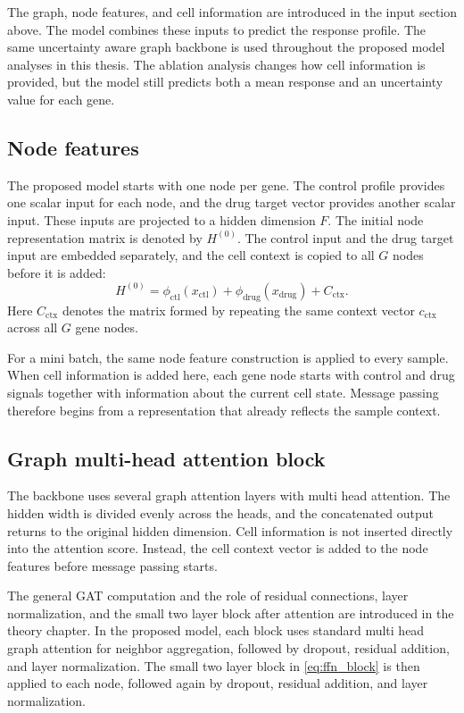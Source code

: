 \noindent The graph, node features, and cell information are introduced in the input section above. The model combines these inputs to predict the response profile. The same uncertainty aware graph backbone is used throughout the proposed model analyses in this thesis. The ablation analysis changes how cell information is provided, but the model still predicts both a mean response and an uncertainty value for each gene.

\subsection{Node features}
The proposed model starts with one node per gene. The control profile provides one scalar input for each node, and the drug target vector provides another scalar input. These inputs are projected to a hidden dimension $F$. The initial node representation matrix is denoted by $H^{(0)}$.
\noindent The control input and the drug target input are embedded separately, and the cell context is copied to all $G$ nodes before it is added:
\begin{equation}
H^{(0)} = \phi_{\mathrm{ctl}}(x_{\mathrm{ctl}}) + \phi_{\mathrm{drug}}(x_{\mathrm{drug}}) + C_{\mathrm{ctx}}.
\end{equation}
\noindent Here $C_{\mathrm{ctx}}$ denotes the matrix formed by repeating the same context vector $c_{\mathrm{ctx}}$ across all $G$ gene nodes.

\noindent For a mini batch, the same node feature construction is applied to every sample.
\noindent When cell information is added here, each gene node starts with control and drug signals together with information about the current cell state. Message passing therefore begins from a representation that already reflects the sample context.

\subsection{Graph multi-head attention block}
\noindent The backbone uses several graph attention layers with multi head attention. The hidden width is divided evenly across the heads, and the concatenated output returns to the original hidden dimension. Cell information is not inserted directly into the attention score. Instead, the cell context vector is added to the node features before message passing starts.

\noindent The general GAT computation and the role of residual connections, layer normalization, and the small two layer block after attention are introduced in the theory chapter. In the proposed model, each block uses standard multi head graph attention for neighbor aggregation, followed by dropout, residual addition, and layer normalization. The small two layer block in \eqref{eq:ffn_block} is then applied to each node, followed again by dropout, residual addition, and layer normalization.

